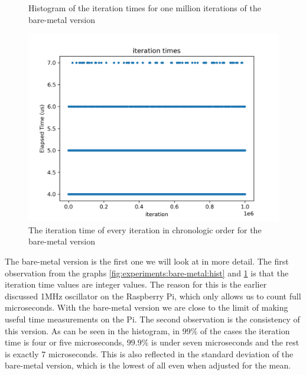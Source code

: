 \begin{figure}[h]
  \begin{center}
    \begin{minipage}{0.48\textwidth}
      \begin{center}
        \caption{Histogram of the iteration times for one million iterations of the bare-metal version}
        \label{fig:experiments:bare-metal:hist}
      \end{center}
    \end{minipage}
    \hspace{0.02\textwidth}
    \begin{minipage}{0.48\textwidth}
      \begin{center}
        \includegraphics[width=\textwidth]{assets/bare-metal/times.png}
        \caption{The iteration time of every iteration in chronologic order for the bare-metal version}
        \label{fig:experiments:bare-metal:times}
      \end{center}
    \end{minipage}
  \end{center}
\end{figure}

The bare-metal version is the first one we will look at in more detail.
The first observation from the graphs \ref{fig:experiments:bare-metal:hist} and \ref{fig:experiments:bare-metal:times} is that the iteration time values are integer values.
The reason for this is the earlier discussed 1MHz oscillator on the Raspberry Pi, which only allows us to count full microseconds.
With the bare-metal version we are close to the limit of making useful time measurements on the Pi.
The second observation is the consistency of this version.
As can be seen in the histogram, in $99\%$ of the cases the iteration time is four or five microseconds, $99.9\%$ is under seven microseconds and the rest is exactly 7 microseconds.
This is also reflected in the standard deviation of the bare-metal version, which is the lowest of all even when adjusted for the mean.

